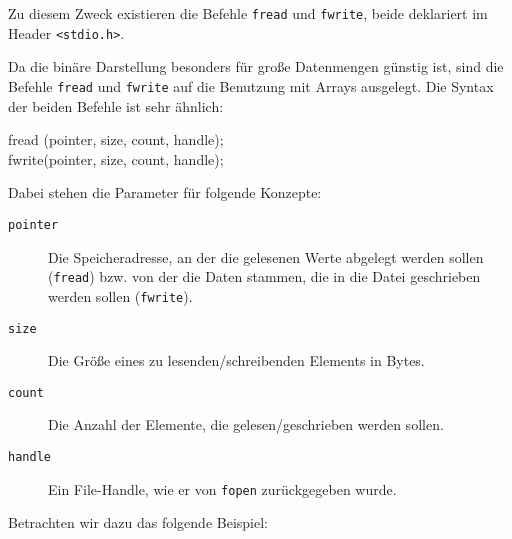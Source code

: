 Zu diesem Zweck existieren die Befehle \texttt{fread} und \texttt{fwrite}, beide deklariert im Header \texttt{<stdio.h>}.

Da die binäre Darstellung besonders für große Datenmengen günstig ist, sind die Befehle \texttt{fread} und \texttt{fwrite} auf die Benutzung mit Arrays ausgelegt. Die Syntax der beiden Befehle ist sehr ähnlich:
\begin{codebox}
fread (pointer, size, count, handle);\\
fwrite(pointer, size, count, handle);
\end{codebox}
Dabei stehen die Parameter für folgende Konzepte:
\begin{description}
\item[\texttt{pointer}] Die Speicheradresse, an der die gelesenen Werte abgelegt werden sollen
		(\texttt{fread}) bzw. von der die Daten stammen, die in die Datei geschrieben werden sollen
		(\texttt{fwrite}).
\item[\texttt{size}] Die Größe eines zu lesenden/schreibenden Elements in Bytes.
\item[\texttt{count}] Die Anzahl der Elemente, die gelesen/geschrieben werden sollen.
\item[\texttt{handle}] Ein File-Handle, wie er von \texttt{fopen} zurückgegeben wurde.
\end{description}

Betrachten wir dazu das folgende Beispiel:


